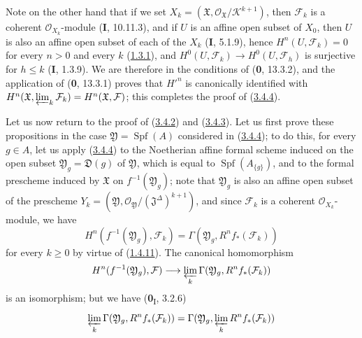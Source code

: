 Note on the other hand that if we set
$X_k=(\mathfrak X,\mathcal O_{\mathfrak X}/\mathcal K^{k+1})$, then
$\mathcal F_k$ is a coherent $\mathcal O_{X_k}$-module (\textbf{I}, 10.11.3), and if
$U$ is an affine open subset of $X_0$, then $U$ is also an affine open subset of
each of the $X_k$ (\textbf{I}, 5.1.9), hence $H^n(U,\mathcal F_k)=0$ for every $n>0$ and
every $k$ (\hyperref[III.1.3.1]{1.3.1}), and
$H^0(U,\mathcal F_k)\to H^0(U,\mathcal F_h)$ is surjective for $h\leq k$
(\textbf{I}, 1.3.9). We are therefore in the conditions of (\textbf{0}, 13.3.2), and the application
of (\textbf{0}, 13.3.1) proves that $H'^{n}$ is canonically identified with
$H^n(\mathfrak X,\varprojlim_k\mathcal F_k)=H^n(\mathfrak X,\mathcal F)$;
this completes the proof of (\hyperref[III.3.4.4]{3.4.4}).

\begin{env}[3.4.5]
\label{III.3.4.5}
Let us now return to the proof of (\hyperref[III.3.4.2]{3.4.2})
and (\hyperref[III.3.4.3]{3.4.3}). Let us first prove these propositions in
the case $\mathfrak Y=\operatorname{Spf}(A)$ considered in
(\hyperref[III.3.4.4]{3.4.4}); to do this, for every $g\in A$, let us apply
(\hyperref[III.3.4.4]{3.4.4}) to the Noetherian affine formal scheme induced
on the open subset $\mathfrak Y_g=\mathfrak D(g)$ of $\mathfrak Y$, which is equal to
$\operatorname{Spf}(A_{\{g\}})$, and to the formal prescheme induced by
$\mathfrak X$ on $f^{-1}(\mathfrak Y_g)$; note that $\mathfrak Y_g$ is
also an affine open subset of the prescheme
$Y_k=(\mathfrak Y,\mathcal O_{\mathfrak Y}/(\mathfrak J^\Delta)^{k+1})$,
and since $\mathcal F_k$ is a coherent $\mathcal O_{X_k}$-module, we have
\[
H^n(f^{-1}(\mathfrak Y_g),\mathcal F_k)
=\Gamma(\mathfrak Y_g,R^nf_*(\mathcal F_k))
\]
for every $k\geq0$ by virtue of
(\hyperref[III.1.4.11]{1.4.11}). The canonical homomorphism
\[
H^n(f^{-1}(\mathfrak Y_g),\mathcal F)
\longrightarrow\varprojlim_k\Gamma(\mathfrak Y_g,R^nf_*(\mathcal F_k))
\]
is an isomorphism; but we have (\textbf{0}\textsubscript{I}, 3.2.6)
\[
\varprojlim_k\Gamma(\mathfrak Y_g,R^nf_*(\mathcal F_k))
=\Gamma(\mathfrak Y_g,\varprojlim_kR^nf_*(\mathcal F_k))
\]


\end{env}
